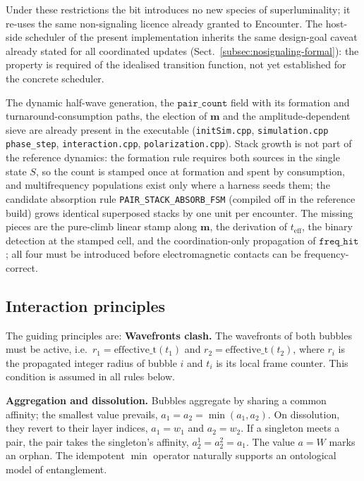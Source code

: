 \documentclass{ijuc}
\begin{document}
Under these restrictions the bit introduces no new species of superluminality; it re-uses the same non-signaling licence already granted to Encounter. The host-side scheduler of the present implementation inherits the same design-goal caveat already stated for all coordinated updates (Sect.~\ref{subsec:nosignaling-formal}): the property is required of the idealised transition function, not yet established for the concrete scheduler.

The dynamic half-wave generation, the $\texttt{pair\_count}$ field with its formation and turnaround-consumption paths, the election of $\boldsymbol{m}$ and the amplitude-dependent sieve are already present in the executable (\texttt{initSim.cpp}, \texttt{simulation.cpp} \texttt{phase\_step}, \texttt{interaction.cpp}, \texttt{polarization.cpp}). Stack growth is not part of the reference dynamics: the formation rule requires both sources in the single state $S$, so the count is stamped once at formation and spent by consumption, and multifrequency populations exist only where a harness seeds them; the candidate absorption rule \texttt{PAIR\_STACK\_ABSORB\_FSM} (compiled off in the reference build) grows identical superposed stacks by one unit per encounter. The missing pieces are the pure-climb linear stamp along $\boldsymbol{m}$, the derivation of $t_{\mathrm{eff}}$, the binary detection at the stamped cell, and the coordination-only propagation of $\texttt{freq\_hit}$; all four must be introduced before electromagnetic contacts can be frequency-correct.

\subsection{Interaction principles}
The guiding principles are:
\medskip\noindent\textbf{Wavefronts clash.} The wavefronts of both bubbles must be active, i.e.\ $r_1 = \mathrm{effective\_t}(t_1)$ and $r_2 = \mathrm{effective\_t}(t_2)$, where $r_i$ is the propagated integer radius of bubble $i$ and $t_i$ is its local frame counter. This condition is assumed in all rules below.

\medskip\noindent\textbf{Aggregation and dissolution.}\label{subsec-role-of-affinity} Bubbles aggregate by sharing a common affinity; the smallest value prevails, $a_1=a_2=\min(a_1,a_2)$. On dissolution, they revert to their layer indices, $a_1=w_1$ and $a_2=w_2$. If a singleton meets a pair, the pair takes the singleton's affinity, $a_2^1=a_2^2=a_1$. The value $a=W$ marks an orphan. The idempotent $\min$ operator naturally supports an ontological model of entanglement.
\end{document}
